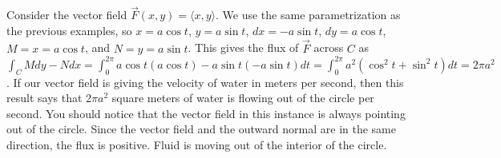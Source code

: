 \begin{example}
%
 Consider the vector field {$\vec F(x,y)=\langle x,y\rangle$}.  We use the same
  parametrization as the previous examples, so $x=a\cos t$, $y=a\sin t$,
  $dx=-a\sin t$, $dy=a\cos t$, $M=x=a\cos t$, and $N=y=a\sin t$. This gives the
  flux of $\vec F$ across $C$ as $\int_C Mdy-Ndx = \int_0^{2\pi} a\cos t
  (a\cos t) - a \sin t (-a\sin t) dt = \int_0^{2\pi} a^2(\cos^2t+\sin^2t)
  dt = 2\pi a^2$.  If our vector field is giving the velocity of water
  in meters per second, then this result says that $2\pi a^2$ square
  meters of water is flowing out of the circle per second.  You should
  notice that the vector field in this instance is always pointing out
  of the circle. Since the vector field and the outward normal are in
  the same direction, the flux is positive. Fluid is moving out of the
  interior of the circle.
\end{example}


